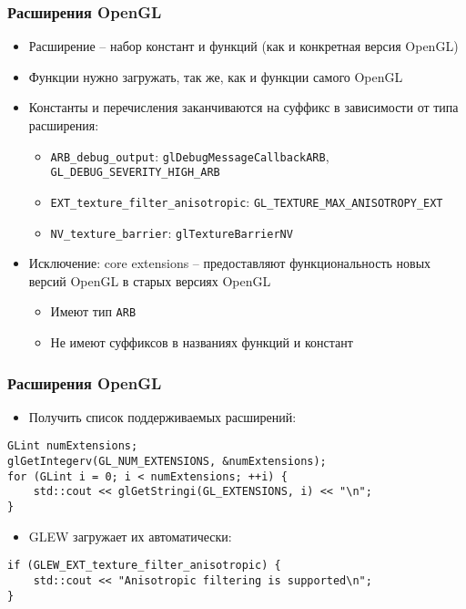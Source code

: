 \documentclass{beamer}
\begin{document}
\begin{frame}[fragile]
\frametitle{Расширения OpenGL}
\begin{itemize}
\item Расширение -- набор констант и функций (как и конкретная версия OpenGL)
\pause
\item Функции нужно загружать, так же, как и функции самого OpenGL
\pause
\item Константы и перечисления заканчиваются на суффикс в зависимости от типа расширения:
\begin{itemize}
\item \verb|ARB_debug_output|: \verb|glDebugMessageCallbackARB|, \verb|GL_DEBUG_SEVERITY_HIGH_ARB|
\item \verb|EXT_texture_filter_anisotropic|: \verb|GL_TEXTURE_MAX_ANISOTROPY_EXT|
\item \verb|NV_texture_barrier|: \verb|glTextureBarrierNV|
\end{itemize}
\pause
\item Исключение: core extensions -- предоставляют функциональность новых версий OpenGL в старых версиях OpenGL
\begin{itemize}
\item Имеют тип \verb|ARB|
\item Не имеют суффиксов в названиях функций и констант
\end{itemize}  
\end{itemize}
\end{frame}

\begin{frame}[fragile]
\frametitle{Расширения OpenGL}
\begin{itemize}
\item Получить список поддерживаемых расширений:
\end{itemize}
\begin{verbatim}
GLint numExtensions;
glGetIntegerv(GL_NUM_EXTENSIONS, &numExtensions);
for (GLint i = 0; i < numExtensions; ++i) {
    std::cout << glGetStringi(GL_EXTENSIONS, i) << "\n";
}
\end{verbatim}
\pause
\begin{itemize}
\item GLEW загружает их автоматически:
\end{itemize}
\begin{verbatim}
if (GLEW_EXT_texture_filter_anisotropic) {
    std::cout << "Anisotropic filtering is supported\n";
}
\end{verbatim}
\end{frame}
\end{document}
